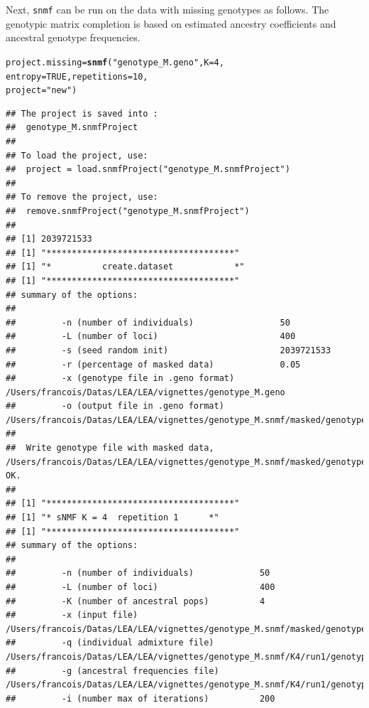 \documentclass[12pt,a4paper,oneside]{article}\usepackage[]{graphicx}\usepackage[]{color}
\makeatletter
\newcommand{\hlnum}[1]{\textcolor[rgb]{0.686,0.059,0.569}{#1}}%
\newcommand{\hlstr}[1]{\textcolor[rgb]{0.192,0.494,0.8}{#1}}%
\newcommand{\hlstd}[1]{\textcolor[rgb]{0.345,0.345,0.345}{#1}}%
\newcommand{\hlkwb}[1]{\textcolor[rgb]{0.69,0.353,0.396}{#1}}%
\newcommand{\hlkwc}[1]{\textcolor[rgb]{0.333,0.667,0.333}{#1}}%
\newcommand{\hlkwd}[1]{\textcolor[rgb]{0.737,0.353,0.396}{\textbf{#1}}}%
\newenvironment{kframe}{%
 \def\at@end@of@kframe{}%
 \ifinner\ifhmode%
  \def\at@end@of@kframe{\end{minipage}}%
  \begin{minipage}{\columnwidth}%
 \fi\fi%
 \def\FrameCommand##1{\hskip\@totalleftmargin \hskip-\fboxsep
 \colorbox{shadecolor}{##1}\hskip-\fboxsep
     \hskip-\linewidth \hskip-\@totalleftmargin \hskip\columnwidth}%
 \MakeFramed {\advance\hsize-\width
   \@totalleftmargin\z@ \linewidth\hsize
   \@setminipage}}%
 {\par\unskip\endMakeFramed%
 \at@end@of@kframe}
\newenvironment{knitrout}{}{} %
\makeatother
\begin{document}
Next, {\tt snmf} can be run on the data with missing genotypes as follows. The genotypic matrix completion is based on estimated ancestry coefficients and ancestral genotype frequencies.
\begin{knitrout}
\color{fgcolor}\begin{kframe}
\begin{alltt}
\hlstd{project.missing} \hlkwb{=} \hlkwd{snmf}\hlstd{(}\hlstr{"genotype_M.geno"}\hlstd{,} \hlkwc{K} \hlstd{=} \hlnum{4}\hlstd{,}
        \hlkwc{entropy} \hlstd{=} \hlnum{TRUE}\hlstd{,} \hlkwc{repetitions} \hlstd{=} \hlnum{10}\hlstd{,}
        \hlkwc{project} \hlstd{=} \hlstr{"new"}\hlstd{)}
\end{alltt}
\begin{verbatim}
## The project is saved into :
##  genotype_M.snmfProject 
## 
## To load the project, use:
##  project = load.snmfProject("genotype_M.snmfProject")
## 
## To remove the project, use:
##  remove.snmfProject("genotype_M.snmfProject")
## 
## [1] 2039721533
## [1] "*************************************"
## [1] "*          create.dataset            *"
## [1] "*************************************"
## summary of the options:
## 
##         -n (number of individuals)                 50
##         -L (number of loci)                        400
##         -s (seed random init)                      2039721533
##         -r (percentage of masked data)             0.05
##         -x (genotype file in .geno format)         /Users/francois/Datas/LEA/LEA/vignettes/genotype_M.geno
##         -o (output file in .geno format)           /Users/francois/Datas/LEA/LEA/vignettes/genotype_M.snmf/masked/genotype_M_I.geno
## 
##  Write genotype file with masked data, /Users/francois/Datas/LEA/LEA/vignettes/genotype_M.snmf/masked/genotype_M_I.geno:		OK.
## 
## [1] "*************************************"
## [1] "* sNMF K = 4  repetition 1      *"
## [1] "*************************************"
## summary of the options:
## 
##         -n (number of individuals)             50
##         -L (number of loci)                    400
##         -K (number of ancestral pops)          4
##         -x (input file)                        /Users/francois/Datas/LEA/LEA/vignettes/genotype_M.snmf/masked/genotype_M_I.geno
##         -q (individual admixture file)         /Users/francois/Datas/LEA/LEA/vignettes/genotype_M.snmf/K4/run1/genotype_M_r1.4.Q
##         -g (ancestral frequencies file)        /Users/francois/Datas/LEA/LEA/vignettes/genotype_M.snmf/K4/run1/genotype_M_r1.4.G
##         -i (number max of iterations)          200

\end{verbatim}
\end{kframe}
\end{knitrout}
\end{document}
